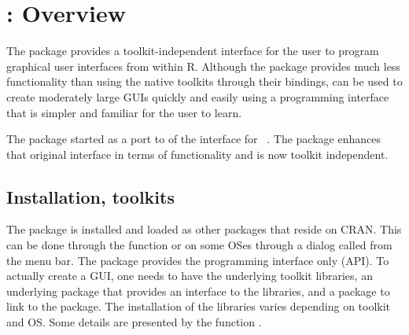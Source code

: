 






 
\newcommand{\ONLYIN}[1]{[only in #1]}

\chapter{: Overview}
\label{sec:overview}


The  package provides a toolkit-independent
interface for the \R\/ user to program graphical user interfaces from
within R. Although the package provides much less functionality than using the
native toolkits through their \R\/ bindings,    can be used to create moderately large
GUIs quickly and easily using a programming interface that is simpler and familiar for the \R\/ user
to learn.

 
The  package started as a port to 
of the  interface for ~\citep{iWidgets}. The
 package  enhances that original interface in
terms of functionality and is now toolkit independent.


\section{Installation, toolkits}
\label{sec:installation}

The  package is installed and loaded as other \R\/
packages that reside on CRAN. This can be done through the function
 or on some OSes through a dialog called from
the menu bar. The  package provides the programming interface only (API). To
actually create a GUI, one needs to have the underlying toolkit libraries, an
underlying \R\/ package that provides an interface to the libraries,
and a  package to link  to the \R\/
package. The installation of the libraries varies depending on toolkit
and OS. Some details are presented by the function
. 

